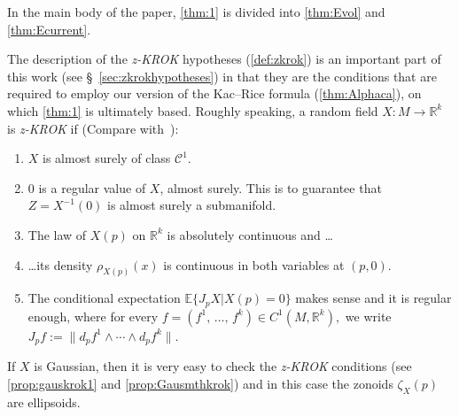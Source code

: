 \documentclass[10pt]{amsart}
\theoremstyle{definition}\newtheorem{defi}[theo]{Definition}\newtheorem{rema}[theo]{Remark}\newtheorem{exam}[theo]{Example}\newtheorem{exem}[theo]{Example}\newtheorem{nota}[theo]{Notation}
\newcommand{\R}{\mathbb{R}}
\newcommand{\EE}{\mathbb{E}}
\newcommand{\mC}{\mathcal{C}}
\newcommand{\zkrok}{\emph{z-KROK}\xspace}
\begin{document}
In the main body of the paper, \cref{thm:1} is divided into \cref{thm:Evol} and \cref{thm:Ecurrent}.

The description of the {\zkrok} hypotheses (\cref{def:zkrok}) is an important part of this work (see \S~\ref{sec:zkrokhypotheses}) in that they are the conditions that are required to employ our version of the Kac--Rice formula (\cref{thm:Alphaca}), on which \cref{thm:1} is ultimately based. Roughly speaking, a random field $X\colon M\to \R^k$ is \zkrok if (Compare with~\cite[2.1]{KRStec}):
\begin{enumerate}
\item $X$ is almost surely of class $\mC^1$.
\item $0$ is a regular value of $X$, almost surely. This is to guarantee that $Z=X^{-1}(0)$ is almost surely a submanifold.
\item The law of $X(p)$ on $\R^k$ is absolutely continuous and \dots
\item \dots its density $\rho_{X(p)}(x)$ is continuous in both variables at $(p,0)$.
\item The conditional expectation $\EE\{J_pX|X(p)=0\}$ makes sense and it is regular enough, where for every $f=(f^1,\,\ldots,\,f^k)\in C^1(M,\R^k),$ we write $J_pf:=\|d_pf^1\wedge\cdots\wedge d_pf^k\|$.
\end{enumerate}
If $X$ is Gaussian, then it is very easy to check the \zkrok conditions (see \cref{prop:gauskrok1} and \cref{prop:Gausmthkrok}) and in this case the zonoids $\zeta_X(p)$ are ellipsoids.
\end{document}
